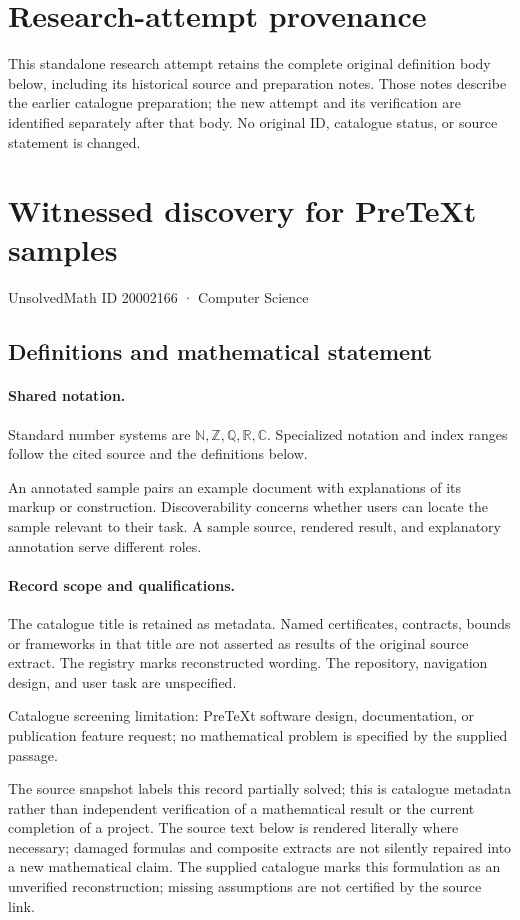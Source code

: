 \documentclass[11pt]{article}
\begin{document}
\section*{Research-attempt provenance}
This standalone research attempt retains the complete original definition body below,
including its historical source and preparation notes. Those notes describe the
earlier catalogue preparation; the new attempt and its verification are identified
separately after that body. No original ID, catalogue status, or source statement is changed.

\section{Witnessed discovery for PreTeXt samples}\label{20002166}
{\small UnsolvedMath ID 20002166 · Computer Science}
\subsection{Definitions and mathematical statement}

\paragraph{Shared notation.}Standard number systems are $\mathbb N,\mathbb Z,\mathbb Q,\mathbb R,\mathbb C$. Specialized notation and index ranges follow the cited source and the definitions below.


An annotated sample pairs an example document with explanations of its markup or construction. Discoverability concerns whether users can locate the sample relevant to their task. A sample source, rendered result, and explanatory annotation serve different roles.
\paragraph{Record scope and qualifications.}
The catalogue title is retained as metadata. Named certificates, contracts, bounds or frameworks in that title are not asserted as results of the original source extract.
The registry marks reconstructed wording. The repository, navigation design, and user task are unspecified.

Catalogue screening limitation: PreTeXt software design, documentation, or publication feature request; no mathematical problem is specified by the supplied passage.

The source snapshot labels this record partially solved; this is catalogue metadata rather than independent verification of a mathematical result or the current completion of a project.
The source text below is rendered literally where necessary; damaged formulas and composite extracts are not silently repaired into a new mathematical claim.
The supplied catalogue marks this formulation as an unverified reconstruction; missing assumptions are not certified by the source link.
\end{document}
